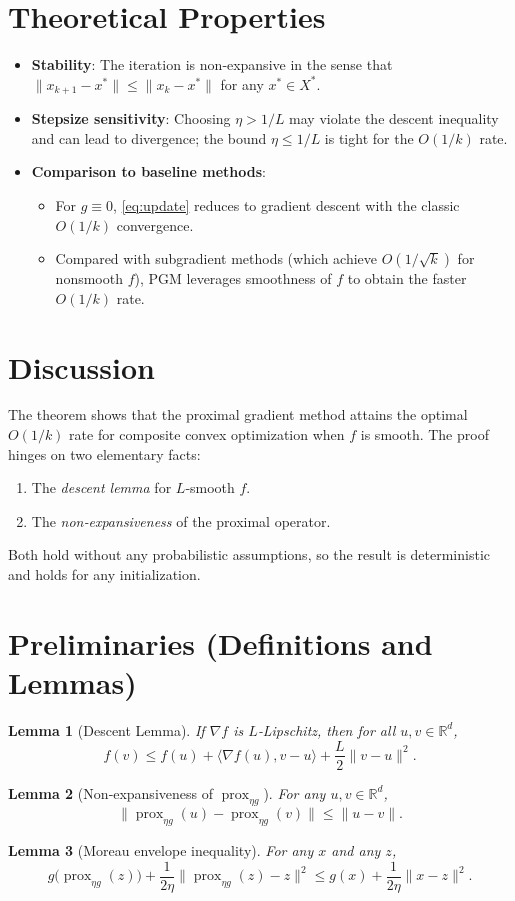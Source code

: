 \documentclass{article}
\newtheorem{lemma}{Lemma}
\begin{document}
\section*{Theoretical Properties}
\begin{itemize}
\item \textbf{Stability}: The iteration is non‑expansive in the sense that $\|x_{k+1}-x^{*}\|\le\|x_{k}-x^{*}\|$ for any $x^{*}\in X^{*}$.
\item \textbf{Stepsize sensitivity}: Choosing $\eta>1/L$ may violate the descent inequality and can lead to divergence; the bound $\eta\le1/L$ is tight for the $O(1/k)$ rate.
\item \textbf{Comparison to baseline methods}:
    \begin{itemize}
        \item For $g\equiv0$, \eqref{eq:update} reduces to gradient descent with the classic $O(1/k)$ convergence.
        \item Compared with subgradient methods (which achieve $O(1/\sqrt{k})$ for nonsmooth $f$), PGM leverages smoothness of $f$ to obtain the faster $O(1/k)$ rate.
    \end{itemize}
\end{itemize}

\section*{Discussion}
The theorem shows that the proximal gradient method attains the optimal $O(1/k)$ rate for composite convex optimization when $f$ is smooth. The proof hinges on two elementary facts:
\begin{enumerate}
\item The \emph{descent lemma} for $L$‑smooth $f$.
\item The \emph{non‑expansiveness} of the proximal operator.
\end{enumerate}
Both hold without any probabilistic assumptions, so the result is deterministic and holds for any initialization.

\section*{Preliminaries (Definitions and Lemmas)}
\begin{lemma}[Descent Lemma]\label{lem:descent}
If $\nabla f$ is $L$‑Lipschitz, then for all $u,v\in\mathbb{R}^{d}$,
\[
f(v)\le f(u)+\langle\nabla f(u),v-u\rangle+\frac{L}{2}\|v-u\|^{2}.
\]
\end{lemma}
\begin{lemma}[Non‑expansiveness of $\operatorname{prox}_{\eta g}$]\label{lem:prox}
For any $u,v\in\mathbb{R}^{d}$,
\[
\bigl\|\operatorname{prox}_{\eta g}(u)-\operatorname{prox}_{\eta g}(v)\bigr\|\le\|u-v\|.
\]
\end{lemma}
\begin{lemma}[Moreau envelope inequality]\label{lem:moreau}
For any $x$ and any $z$,
\[
g\bigl(\operatorname{prox}_{\eta g}(z)\bigr)+\frac{1}{2\eta}\bigl\|\operatorname{prox}_{\eta g}(z)-z\bigr\|^{2}
\le g(x)+\frac{1}{2\eta}\|x-z\|^{2}.
\]
\end{lemma}
\end{document}
